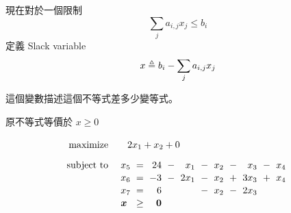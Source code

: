 \documentclass[standalone]{beamer}
\begin{document}
\begin{frame}{}
  現在對於一個限制
  \[ \sum_j a_{i, j} x_j \leq b_i \]
  定義 Slack variable
  \[ x \triangleq b_i - \sum_j a_{i, j} x_j \]
  \pause

  這個變數描述這個不等式差多少變等式。
  \pause
  \medskip

  原不等式等價於 $x \geq 0$
\end{frame}

\begin{frame}{}
\begin{overlayarea}{\textwidth}{3cm}
   {
    \[
      \linearprog{2x_1 + x_2 + 0}{
        \arraycolsep=3pt
        \begin{array}[t]{lc*4{rc}r}
          x_5 & = & 24 &-& x_1  &-& x_2 &-& x_3 &-& x_4  \\
          x_6 & = & -3 &-& 2x_1 &-& x_2 &+& 3x_3 &+& x_4  \\
          x_7 & = & 6&&  &-& x_2 &-& 2x_3 &&  \\
          \bm{x} & \geq & \bm{0} & & & & & & & &
      \end{array}
      }
    \]
  }
\end{overlayarea}
\end{frame}
\end{document}
